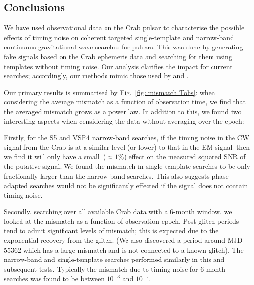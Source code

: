 \documentclass[../full_thesis/full_thesis.tex]{subfiles}
\begin{document}

\subsection{Conclusions}
\label{sec: narrow-band conclusions}
We have used observational data on the Crab pulsar to characterise the possible
effects of timing noise on coherent targeted single-template  and narrow-band
continuous gravitational-wave searches for pulsars.  This was done by generating fake
signals based on the Crab ephemeris data and searching for them using templates
without timing noise. Our analysis clarifies the impact for current searches;
accordingly, our methods mimic those used by \citet{LIGO2008} and \citet{LIGO2015}.

Our primary results is summarised by Fig.~\ref{fig: mismatch Tobs}: 
when considering the average mismatch as 
a function of observation time,  we find that the averaged
mismatch grows as a power law. In addition to this, we found two interesting
aspects when considering the data without averaging over the epoch:

Firstly, for the S5 and VSR4 narrow-band searches, if the timing noise in the
CW signal from the Crab is at a similar level (or lower) to that in the EM
signal, then we find it will only have a small~($\approx1\%$) effect on the
measured squared SNR of the putative signal.  We found the mismatch in
single-template searches to be only fractionally larger than the narrow-band
searches.  This also suggests phase-adapted searches would not be significantly
effected if the signal does not contain timing noise.

Secondly, searching over all available Crab data with a 6-month window, we
looked at the mismatch as a function of observation epoch. Post glitch periods
tend to admit significant levels of mismatch; this is expected due to the
exponential recovery from the glitch. (We also discovered a period around MJD
55362 which has a large mismatch and is not connected to a known glitch). The
narrow-band and single-template searches performed similarly in this and
subsequent tests. Typically the mismatch due to timing noise for 6-month
searches was found to be between $10^{-3}$ and $10^{-2}$.
\end{document}
